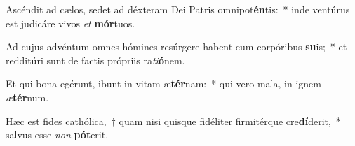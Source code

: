 \item Ascéndit ad cælos, sedet ad déxteram Dei Patris omnipot\textbf{én}tis:~* inde ventúrus est judicáre vivos \textit{et} \textbf{mór}tuos.
\item Ad cujus advéntum omnes hómines resúrgere habent cum corpóribus \textbf{su}is;~* et redditúri sunt de factis própriis ra\textit{ti}\textbf{ó}nem.
\item Et qui bona egérunt, ibunt in vitam æ\textbf{tér}nam:~* qui vero mala, in ignem \textit{æ}\textbf{tér}num.
\item Hæc est fides cathólica,~† quam nisi quisque fidéliter firmitérque cre\textbf{dí}derit,~* salvus esse \textit{non} \textbf{pót}erit.
